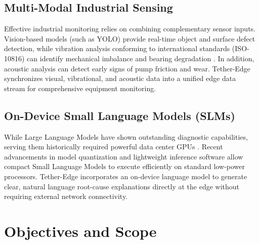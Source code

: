 \documentclass[conference]{IEEEtran}
\begin{document}
    \subsection{Multi-Modal Industrial Sensing}
    Effective industrial monitoring relies on combining complementary sensor inputs. Vision-based models (such as YOLO) provide real-time object and surface defect
    detection, while vibration analysis conforming to international standards (ISO-10816) can identify mechanical imbalance and bearing degradation \cite{b5}. In
    addition, acoustic analysis can detect early signs of pump friction and wear. Tether-Edge synchronizes visual, vibrational, and acoustic data into a unified
    edge data stream for comprehensive equipment monitoring.

    \subsection{On-Device Small Language Models (SLMs)}
    While Large Language Models have shown outstanding diagnostic capabilities, serving them historically required powerful data center GPUs \cite{b14}. Recent
    advancements in model quantization and lightweight inference software \cite{b15} allow compact Small Language Models to execute efficiently on standard
    low-power processors. Tether-Edge incorporates an on-device language model to generate clear, natural language root-cause explanations directly at the edge
    without requiring external network connectivity.

    \section{Objectives and Scope}
\end{document}
